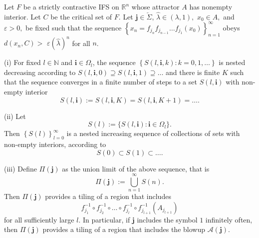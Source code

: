 \documentclass[10pt,a4paper]{amsart}
\begin{document}
\begin{theorem}
\label{tiling theorem} Let $F$ be a strictly contractive IFS on $\mathbb{R}%
^{n}$ whose attractor $A$ has nonempty interior. Let $C$ be the critical set
of $F.$ Let $\mathbf{j\in}\overleftarrow{\Sigma}$, $\widehat{\lambda}%
\in(\lambda,1),$ $x_{0}\in A,$ and $\varepsilon>0,$ be fixed such that the
sequence $\left\{  x_{n}=f_{j_{n}}f_{j_{n-1}}\dots f_{j_{1}}(x_{0})\right\}
_{n=1}^{\infty}$ obeys $d(x_{n},C)>$ $\varepsilon\left(  \widehat{\lambda
}\right)  ^{n}$ for all $n$.

(i) For fixed $l\in\mathbb{N}$ and $\mathbf{i\in}\Omega_{l}$, the sequence
$\left\{  S(l,\mathbf{i},k):k=0,1,\dots\right\}  $ is nested decreasing
according to $S(l,\mathbf{i},0)\supseteq S(l,\mathbf{i},1)\supseteq\dots$ and
there is finite $K$ such that the sequence converges in a finite number of
steps to a set $S(l,\mathbf{i})$ with non-empty interior%
\[
S(l,\mathbf{i}):=S(l,\mathbf{i},K)=S(l,\mathbf{i},K+1)=\dots.
\]


(ii) Let%
\[
S(l):=\{S(l,\mathbf{i}):\mathbf{i}\in\Omega_{l}\}.
\]
Then $\left\{  S(l)\right\}  _{l=0}^{\infty}$ is a nested increasing sequence
of collections of sets with non-empty interiors, according to
\[
S(0)\subset S(1)\subset\dots.
\]


(iii) Define $\Pi(\mathbf{j})$ as the union limit of the above sequence, that
is
\[
\Pi(\mathbf{j}):=%
{\textstyle\bigcup\limits_{n=1}^{\infty}}
S(n).
\]
Then $\Pi(\mathbf{j})$ provides a tiling of a region that includes
\[
f_{j_{1}}^{-1}\circ f_{j_{2}}^{-1}\circ\dots\circ f_{j_{l}}^{-1}\circ
f_{j_{l+1}}^{-1}(A_{j_{l+1}})
\]
for all sufficiently large $l$. In particular, if $\mathbf{j}$ includes the
symbol $1$ infinitely often, then $\Pi(\mathbf{j})$ provides a tiling of a
region that includes the blowup $\mathcal{A}\left(  \mathbf{j}\right)  $.
\end{theorem}
\end{document}
